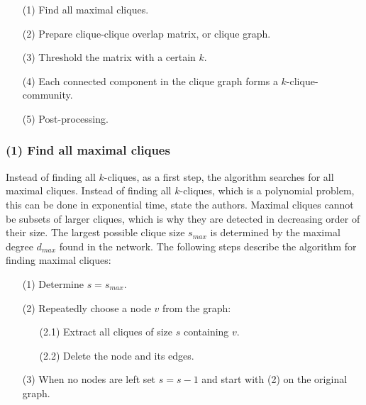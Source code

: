 \documentclass[runningheads,a4paper]{llncs}
\begin{document}
\noindent
\colorbox{usethiscolorhere}{
\begin{minipage}{\dimexpr\textwidth-2\fboxsep}

\begin{enumerate}
\small
\item[(1)] Find all maximal cliques.
\item[(2)] Prepare clique-clique overlap matrix, or clique graph.
\item[(3)] Threshold the matrix with a certain $k$.
\item[(4)] Each connected component in the clique graph forms a $k$-clique-community.
\item[(5)] Post-processing.
\end{enumerate}

\end{minipage}
}

\subsubsection{(1) Find all maximal cliques}
Instead of finding all $k$-cliques, as a first step, the algorithm searches for all maximal cliques. Instead of finding all $k$-cliques, which is a polynomial problem, this can be done in exponential time, state the authors.
Maximal cliques cannot be subsets of larger cliques, which is why they are detected in decreasing order of their size.
The largest possible clique size $s_{max}$ is determined by the maximal degree $d_{max}$ found in the network. The following steps describe the algorithm for finding maximal cliques:

\medskip

\noindent
\colorbox{usethiscolorhere}{
\begin{minipage}{\dimexpr\textwidth-2\fboxsep}

\begin{enumerate}
\small
\item[(1)] Determine $s=s_{max}$.
\item[(2)] Repeatedly choose a node $v$ from the graph:
	\begin{enumerate}
		\item[(2.1)] Extract all cliques of size $s$ containing $v$.
		\item[(2.2)] Delete the node and its edges.
	\end{enumerate}
\item[(3)] When no nodes are left set $s=s-1$ and start with (2) on the original graph.
\end{enumerate}

\end{minipage}
}
\end{document}
